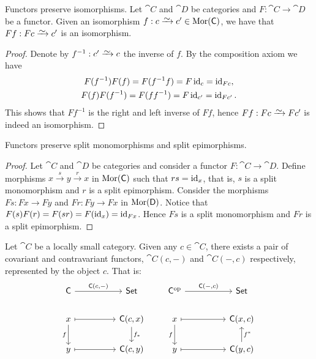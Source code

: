 \begin{lemma}\label{lem: functor preserve iso}
  Functors preserve isomorphisms. Let \(\cat C\) and \(\cat D\) be categories
  and \(F: \cat C \to \cat D\) be a functor. Given an isomorphism \(f: c \isoto
  c' \in \Mor(\cat C)\), we have that \(F f : F c \isoto c'\) is an isomorphism.
\end{lemma}

\begin{proof}
  Denote by \(f^{-1}: c' \isoto c\) the inverse of \(f\). By the composition axiom
  we have 
  \begin{gather*}
    F (f^{-1}) F (f) = F (f^{-1} f) = F \operatorname{id}_c    = \operatorname{id}_{F c}, \\
    F (f) F (f^{-1}) = F (f f^{-1}) = F \operatorname{id}_{c'} = \operatorname{id}_{F c'}.
  \end{gather*}
  This shows that \(F f^{-1}\) is the right and left inverse of \(F f\), hence
  \(F f: F c \isoto F c'\) is indeed an isomorphism.
\end{proof}

\begin{lemma}
  Functors preserve split monomorphisms and split epimorphisms.
\end{lemma}

\begin{proof}
  Let \(\cat C\) and \(\cat D\) be categories and consider a functor \(F: \cat C
  \to \cat D\). Define morphisms \(x \xrightarrow s y \xrightarrow r x\) in
  \(\operatorname{Mor}(\mathsf C)\) such that \(r s = \operatorname{id}_x\), that is, \(s\) is a split
  monomorphism and \(r\) is a split epimorphism. Consider the morphisms \(F s: F
  x \to F y\) and \(F r: F y \to F x\) in \(\operatorname{Mor}(\mathsf D)\). Notice that \(F (s)
  F(r) = F(s r) = F(\operatorname{id}_x) = \operatorname{id}_{F x}\). Hence \(F s\) is a split monomorphism
and \(F r\) is a split epimorphism.
\end{proof}

\begin{definition}
  Let \(\cat C\) be a locally small category. Given any \(c \in \cat C\), there
  exists a pair of covariant and contravariant functors, \(\cat C(c, -)\) and
  \(\cat C(-, c)\) respectively, represented by the object \(c\). That is: 
  \[
    \begin{tikzcd}
      \cat C \ar[rr, "\cat C{(c, -)}"] & & \cat{Set}
      \\
      x \ar[rr, maps to] \ar[d, swap, "f"]
      & & \cat C(c, x) \ar[d, "f_*"]
      \\
      y \ar[rr, maps to] & & \cat C(c, y)
    \end{tikzcd}
    \qquad
    \begin{tikzcd}
      \cat C^\op \ar[rr, "\cat C{(-, c)}"] & & \cat{Set}
      \\
      x \ar[rr, maps to] \ar[d, swap, "f"]
      & & \cat C(x, c) 
      \\
      y \ar[rr, maps to] & & \cat C(y, c) \ar[u, swap, "f^*"]
    \end{tikzcd}
  \] 
\end{definition}

